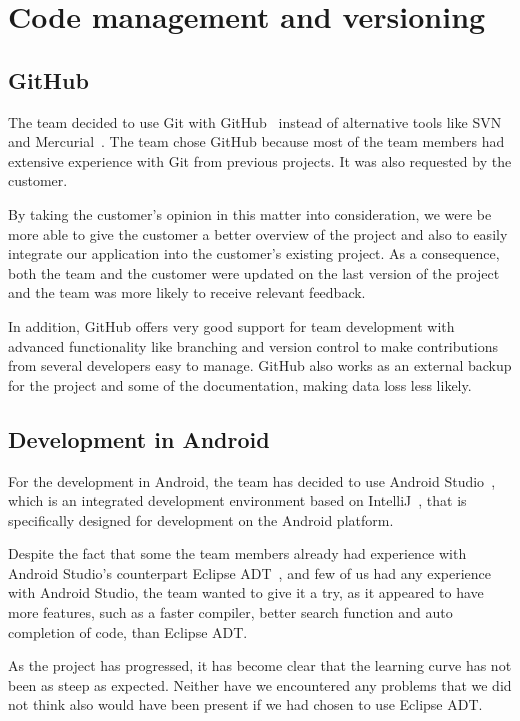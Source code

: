 \section{Code management and versioning}
\subsection{GitHub}
The team decided to use Git with GitHub~\cite{github} instead of alternative tools like SVN~\cite{svn} and Mercurial~\cite{mercurial}. 
The team chose GitHub because most of the team members had extensive experience with Git from previous projects. It was also requested by the customer. 

By taking the customer's opinion in this matter into consideration, we were be more able to give the customer a better overview of the project and also to easily integrate our application into the customer's existing project. As a consequence, both the team and the customer were updated on the last version of the project and the team was more likely to receive relevant feedback. 

In addition, GitHub offers very good support for team development 
with advanced functionality like branching and version control to make contributions from several developers easy 
to manage. GitHub also works as an external backup for the project and some of the documentation, making data loss less likely.

\subsection{Development in Android}
For the development in Android, the team has decided to use Android Studio~\cite{Android-studio}, which is an integrated development environment based on IntelliJ~\cite{intellij}, that is specifically designed for development on the Android platform.

Despite the fact that some the team members already had experience with Android Studio's counterpart Eclipse ADT~\cite{eclipseadt}, and few of us had any experience with Android Studio, the team wanted to give it a try, as it appeared to have more features, such as a faster compiler, better search function and auto completion of code, than Eclipse ADT. 

As the project has progressed, it has become clear that the learning curve has not been as steep as expected. Neither have we encountered any problems that we did not think also would have been present if we had chosen to use Eclipse ADT.

